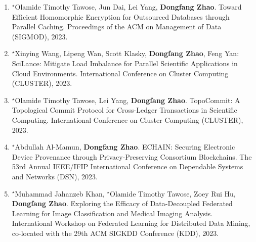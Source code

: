 \documentclass[11pt,]{scrartcl}
\begin{document}
\begin{enumerate}


\item $^\star$Olamide Timothy Tawose, Jun Dai, Lei Yang, \textbf{Dongfang Zhao}.
Toward Efficient Homomorphic Encryption for Outsourced Databases through Parallel Caching. 
Proceedings of the ACM on Management of Data (SIGMOD), 2023.

\item $^\star$Xinying Wang, Lipeng Wan, Scott Klasky, \textbf{Dongfang Zhao}, Feng Yan:
SciLance: Mitigate Load Imbalance for Parallel Scientific Applications in Cloud Environments. International Conference on Cluster Computing (CLUSTER), 2023.

\item $^\star$Olamide Timothy Tawose, Lei Yang, \textbf{Dongfang Zhao}.
TopoCommit: A Topological Commit Protocol for Cross-Ledger Transactions in Scientific Computing. International Conference on Cluster Computing (CLUSTER), 2023.


\item 	$^\star$Abdullah Al-Mamun, \textbf{Dongfang Zhao}.
ECHAIN: Securing Electronic Device Provenance through Privacy-Preserving Consortium Blockchains. 
The 53rd Annual IEEE/IFIP International Conference on Dependable Systems and Networks (DSN), 2023.

\item $^\star$Muhammad Jahanzeb Khan, $^\star$Olamide Timothy Tawose, Zoey Rui Hu, \textbf{Dongfang Zhao}.
Exploring the Efficacy of Data-Decoupled Federated Learning for Image Classification and Medical Imaging Analysis. 
International Workshop on Federated Learning for Distributed Data Mining,
co-located with the 29th ACM SIGKDD Conference (KDD), 2023.


\end{enumerate}
\end{document}
